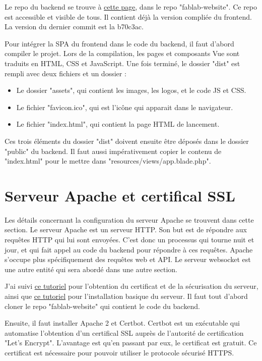 \documentclass[
    iai, %
    eai, %
]{heig-tb}
\begin{document}
Le repo du backend se trouve à \href{https://github.com/TristanLieberherr/fablab-website}{cette page}, dans le repo "fablab-website". Ce repo est accessible et visible de tous. Il contient déjà la version compliée du frontend. La version du dernier commit est la b70c3ac.

Pour intégrer la SPA du frontend dans le code du backend, il faut d'abord compiler le projet. Lors de la compilation, les pages et composants Vue sont traduits en HTML, CSS et JavaScript.
Une fois terminé, le dossier "dist" est rempli avec deux fichiers et un dossier :
\begin{itemize}
  \item Le dossier "assets", qui contient les images, les logos, et le code JS et CSS.
  \item Le fichier "favicon.ico", qui est l'icône qui apparait dans le navigateur.
  \item Le fichier "index.html", qui contient la page HTML de lancement.
\end{itemize}
\bigskip

Ces trois éléments du dossier "dist" doivent ensuite être déposés dans le dossier "public" du backend. Il faut aussi impérativement copier le contenu de "index.html" pour le mettre dans "resources/views/app.blade.php".

\newpage
\section{Serveur Apache et certifical SSL}
Les détails concernant la configuration du serveur Apache se trouvent dans cette section. Le serveur Apache est un serveur HTTP. Son but est de répondre aux requêtes HTTP qui lui sont envoyées. C'est donc un processus qui tourne nuit et jour, et qui fait appel au code du backend pour répondre à ces requêtes. Apache s'occupe plus spécifiquement des requêtes web et API. Le serveur websocket est une autre entité qui sera abordé dans une autre section.

J'ai suivi \href{https://www.digitalocean.com/community/tutorials/how-to-secure-apache-with-let-s-encrypt-on-ubuntu-20-04}{ce tutoriel} pour l'obtention du certificat et de la sécurisation du serveur, ainsi que \href{https://www.digitalocean.com/community/tutorials/how-to-set-up-apache-virtual-hosts-on-ubuntu-18-04}{ce tutoriel} pour l'installation basique du serveur.
Il faut tout d'abord cloner le repo "fablab-website" qui contient le code du backend.

Ensuite, il faut installer Apache 2 et Certbot. Certbot est un exécutable qui automatise l'obtention d'un certifical SSL auprès de l'autorité de certification "Let's Encrypt". L'avantage est qu'en passant par eux, le certificat est gratuit. Ce certificat est nécessaire pour pouvoir utiliser le protocole sécurisé HTTPS.
\end{document}

